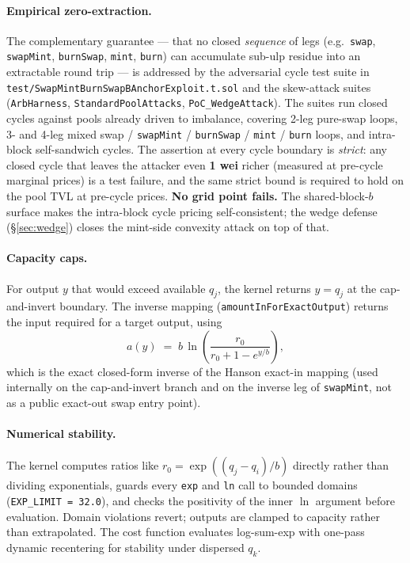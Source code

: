 \documentclass[11pt]{article}
\begin{document}
\paragraph{Empirical zero-extraction.}
The complementary guarantee --- that no closed \emph{sequence} of legs
(e.g.\ \texttt{swap}, \texttt{swapMint}, \texttt{burnSwap},
\texttt{mint}, \texttt{burn}) can accumulate sub-ulp residue into an
extractable round trip --- is addressed by the adversarial cycle test
suite in \texttt{test/SwapMintBurnSwapBAnchorExploit.t.sol} and the skew-attack
suites (\texttt{ArbHarness}, \texttt{StandardPoolAttacks},
\texttt{PoC\_WedgeAttack}). The suites run closed cycles against pools
already driven to imbalance, covering 2-leg pure-swap loops, 3- and
4-leg mixed swap / \texttt{swapMint} / \texttt{burnSwap} /
\texttt{mint} / \texttt{burn} loops, and intra-block self-sandwich
cycles. The assertion at every cycle boundary is \emph{strict}: any
closed cycle that leaves the attacker even \textbf{1 wei} richer
(measured at pre-cycle marginal prices) is a test failure, and the same
strict bound is required to hold on the pool TVL at pre-cycle prices.
\textbf{No grid point fails.} The shared-block-$b$ surface makes the
intra-block cycle pricing self-consistent; the
wedge defense (\S\ref{sec:wedge}) closes the
mint-side convexity attack on top of that.

\paragraph{Capacity caps.}
For output $y$ that would exceed available $q_j$, the kernel returns
$y = q_j$ at the cap-and-invert boundary. The inverse mapping
(\texttt{amountInForExactOutput}) returns the input required for a
target output, using
\begin{equation}
  a(y) \;=\; b \,\ln\!\left(\frac{r_0}{r_0 + 1 - e^{y/b}}\right),
\end{equation}
which is the exact closed-form inverse of the Hanson exact-in mapping
(used internally on the cap-and-invert branch and on the inverse leg of
\texttt{swapMint}, not as a public exact-out swap entry point).

\paragraph{Numerical stability.}
The kernel computes ratios like $r_0 = \exp((q_j - q_i)/b)$ directly
rather than dividing exponentials, guards every \texttt{exp} and
\texttt{ln} call to bounded domains (\texttt{EXP\_LIMIT = 32.0}), and
checks the positivity of the inner $\ln$ argument before evaluation.
Domain violations revert; outputs are clamped to capacity rather than
extrapolated. The cost function evaluates log-sum-exp with one-pass
dynamic recentering for stability under dispersed $q_k$.
\end{document}
